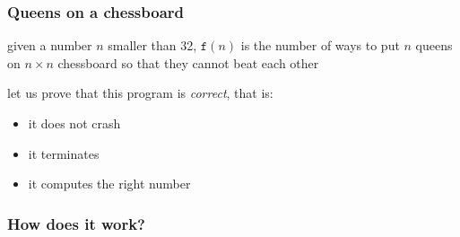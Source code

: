 \documentclass[compress]{beamer}
\begin{document}
\begin{frame}
  \frametitle{Queens on a chessboard}

given a number $n$ smaller than 32, 
$\mathtt{f}(n)$ is the number of ways to put $n$ queens on $n\times n$
chessboard so that they cannot beat each other

\Pause

let us prove that this program is \emph{correct}, that is:
\begin{itemize}
\item it does not crash
\item it terminates
\item it computes the right number
\end{itemize}
\end{frame}

\begin{frame}
  \frametitle{How does it work?}
\end{frame}
\end{document}
